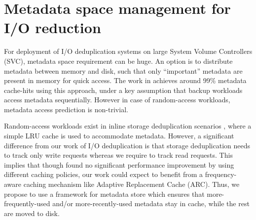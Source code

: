 \section{Metadata space management for I/O reduction}
For deployment of I/O deduplication systems
on large System Volume
Controllers (SVC), metadata space requirement can be huge.
An option is to distribute metadata between memory and disk, such that only
``important'' metadata are present in memory for quick
access. The work in \cite{data-domain} achieves around 99\%
metadata cache-hits using this approach, under a key assumption
that backup workloads access metadata sequentially.
However in case of random-access workloads,
metadata access prediction is non-trivial.

Random-access workloads exist in inline storage deduplication scenarios
\cite{idedup}, where a simple LRU cache is used to accommodate metadata.
However, a significant difference from our work
of I/O deduplication is that storage deduplication needs to track only
write requests whereas we require to track read requests.
This implies that though \cite{idedup} found no significant performance
improvement by using different caching policies, our work
could expect to benefit from a frequency-aware caching mechanism like
Adaptive Replacement Cache (ARC).
Thus, we propose to use a framework for metadata store which
ensures that more-frequently-used and/or more-recently-used
metadata stay in cache, while the rest are moved to disk.

